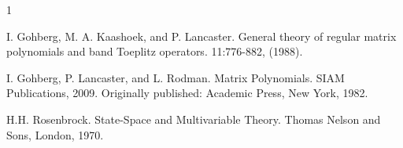 \documentclass[a4paper]{amsart}
\begin{document}
\begin{thebibliography}{1}

I. Gohberg, M. A. Kaashoek, and P. Lancaster.
\newblock General theory of regular matrix polynomials and band Toeplitz operators.
 11:776-882, (1988).

 I. Gohberg, P. Lancaster, and L. Rodman.
\newblock Matrix Polynomials.
\newblock SIAM Publications, 2009.
\newblock Originally published: Academic Press, New York, 1982.

 H.H. Rosenbrock.
\newblock State-Space and Multivariable Theory.
\newblock Thomas Nelson and Sons, London, 1970.
\end{thebibliography}
\end{document}
